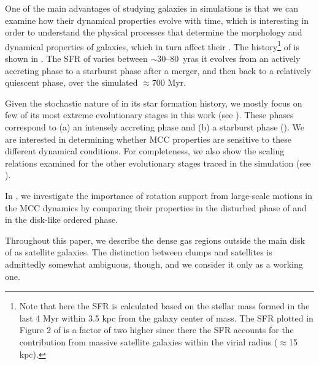 \IfFileExists{emulateapjlegacy.cls}{\documentclass[iop]{emulateapjlegacy}}{\documentclass[iop]{emulateapj}}
\begin{document}
One of the main advantages of studying galaxies in simulations is that we can examine how their dynamical properties evolve with time, which
is interesting in order to understand the physical processes that determine the morphology and dynamical properties of galaxies, which in turn affect their \SF.
%
The \SF history\footnote{Note that here the SFR is calculated based on the stellar mass formed in the last 4 Myr within 3.5 kpc from the galaxy center of mass. The SFR plotted in Figure 2 of \citet{Pallottini17b} is a factor of two higher since there the SFR accounts for the contribution from massive satellite galaxies within the virial radius ($\approx$15\,kpc).} of \flower is shown in . The SFR of \flower varies between $\sim$30--80 \Msun\,yr\pmOne as it evolves from an actively accreting phase to a starburst phase after a merger, and then back to a relatively quiescent phase, over the simulated $\approx 700$ Myr.

Given the stochastic nature of \flower in its star formation history, we mostly focus on few of its most extreme evolutionary stages in this work (see ).
%
These phases correspond to (a) an intensely accreting phase and (b) a starburst phase (). We are interested in determining whether MCC properties are sensitive to these different dynamical conditions. For completeness, we also show the scaling relations examined for the other evolutionary stages traced in the simulation (see ).

In , we investigate the importance of rotation support from large-scale motions in the MCC dynamics by comparing their properties 
in the disturbed phase of \flower and in the disk-like ordered phase. 

Throughout this paper, we describe the dense gas regions outside the main disk of \flower as satellite galaxies. The distinction between clumps and satellites is admittedly somewhat ambiguous, though, and we consider it only as a working one.
\end{document}
